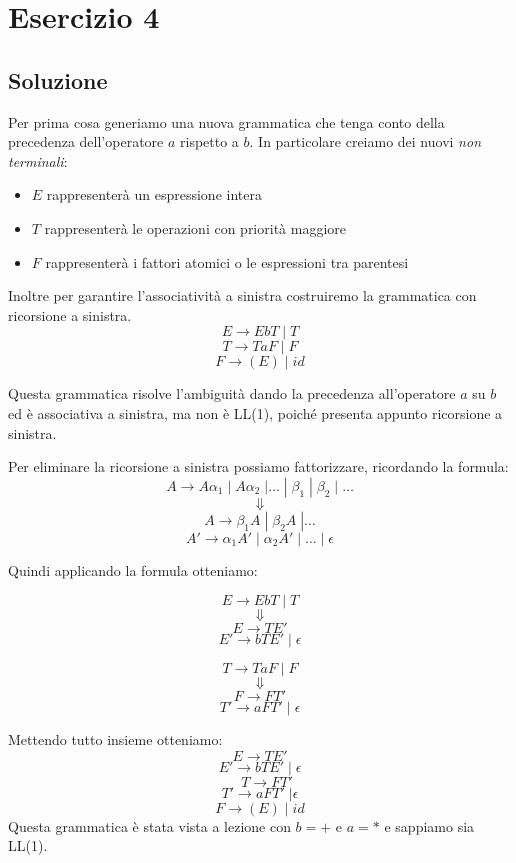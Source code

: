 \documentclass[11pt]{article}
\begin{document}
\section{Esercizio 4}
\subsection*{Soluzione}
Per prima cosa generiamo una nuova grammatica che tenga conto della precedenza 
dell'operatore $a$ rispetto a $b$. In particolare creiamo dei nuovi \textit{non terminali}:
\begin{itemize}
  \item $E$ rappresenterà un espressione intera
  \item $T$ rappresenterà le operazioni con priorità maggiore
  \item $F$ rappresenterà i fattori atomici o le espressioni tra parentesi 
\end{itemize}
Inoltre per garantire l'associatività a sinistra costruiremo la grammatica con ricorsione
a sinistra.
$$E \rightarrow EbT\;|\;T$$
$$T \rightarrow TaF\;|\;F$$
$$F \rightarrow (E)\;|\;id$$

\noindent Questa grammatica risolve l'ambiguità dando la precedenza all'operatore $a$ su $b$ ed è 
associativa a sinistra, ma non è LL(1), poiché presenta appunto ricorsione a sinistra.

\noindent Per eliminare la ricorsione a sinistra possiamo fattorizzare, ricordando
la formula:
$$A \rightarrow A\alpha_1 \; | \; A\alpha_2\; | \dots \; | \; \beta_1 \; |\; \beta_2\;|\; \dots$$
$$\Downarrow$$
$$A \rightarrow \beta_1 A \; |\; \beta_2 A \; | \dots$$
$$A' \rightarrow \alpha_1 A' \; | \; \alpha_2 A' \; | \; \dots \; | \; \epsilon$$

\noindent Quindi applicando la formula otteniamo:
\begin{center}
  \begin{minipage}{0.4\linewidth}
  $$E \rightarrow EbT \;|\; T$$
  $$\Downarrow$$
  $$E \rightarrow TE'$$
  $$E' \rightarrow bTE' \;| \; \epsilon$$
  \end{minipage}
  \hspace{1cm}
  \begin{minipage}{0.4\linewidth}
  $$T \rightarrow TaF \;|\; F$$
  $$\Downarrow$$
  $$F \rightarrow FT'$$
  $$T' \rightarrow aFT' \;| \; \epsilon$$
  \end{minipage}
\end{center}
Mettendo tutto insieme otteniamo:
$$E \rightarrow TE'$$
$$E'\rightarrow bTE' \;|\; \epsilon$$
$$\quad T \rightarrow FT' $$$$ T'\rightarrow aFT'\;| \epsilon$$
$$
F \rightarrow (E) \; | \; id
$$
Questa grammatica è stata vista a lezione con $b = +$ e $a = *$ e sappiamo sia LL(1).
\end{document}
